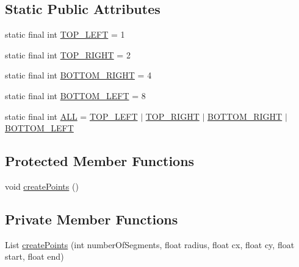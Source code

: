 \subsection*{Static Public Attributes}
\begin{DoxyCompactItemize}
\item 
static final int \mbox{\hyperlink{classorg_1_1newdawn_1_1slick_1_1geom_1_1_rounded_rectangle_aaaa1eab1fd4a8d956245dd981ce1dfab}{T\+O\+P\+\_\+\+L\+E\+FT}} = 1
\item 
static final int \mbox{\hyperlink{classorg_1_1newdawn_1_1slick_1_1geom_1_1_rounded_rectangle_a03e561bba16398be265f6949561f05bd}{T\+O\+P\+\_\+\+R\+I\+G\+HT}} = 2
\item 
static final int \mbox{\hyperlink{classorg_1_1newdawn_1_1slick_1_1geom_1_1_rounded_rectangle_a747856ebcd2fa8d0b68c3506a666da20}{B\+O\+T\+T\+O\+M\+\_\+\+R\+I\+G\+HT}} = 4
\item 
static final int \mbox{\hyperlink{classorg_1_1newdawn_1_1slick_1_1geom_1_1_rounded_rectangle_af5715c13c3b07283282396746796ec1c}{B\+O\+T\+T\+O\+M\+\_\+\+L\+E\+FT}} = 8
\item 
static final int \mbox{\hyperlink{classorg_1_1newdawn_1_1slick_1_1geom_1_1_rounded_rectangle_a5f7a27b3a8d4b4b9c2ea8776674a0fd8}{A\+LL}} = \mbox{\hyperlink{classorg_1_1newdawn_1_1slick_1_1geom_1_1_rounded_rectangle_aaaa1eab1fd4a8d956245dd981ce1dfab}{T\+O\+P\+\_\+\+L\+E\+FT}} $\vert$ \mbox{\hyperlink{classorg_1_1newdawn_1_1slick_1_1geom_1_1_rounded_rectangle_a03e561bba16398be265f6949561f05bd}{T\+O\+P\+\_\+\+R\+I\+G\+HT}} $\vert$ \mbox{\hyperlink{classorg_1_1newdawn_1_1slick_1_1geom_1_1_rounded_rectangle_a747856ebcd2fa8d0b68c3506a666da20}{B\+O\+T\+T\+O\+M\+\_\+\+R\+I\+G\+HT}} $\vert$ \mbox{\hyperlink{classorg_1_1newdawn_1_1slick_1_1geom_1_1_rounded_rectangle_af5715c13c3b07283282396746796ec1c}{B\+O\+T\+T\+O\+M\+\_\+\+L\+E\+FT}}
\end{DoxyCompactItemize}
\subsection*{Protected Member Functions}
\begin{DoxyCompactItemize}
\item 
void \mbox{\hyperlink{classorg_1_1newdawn_1_1slick_1_1geom_1_1_rounded_rectangle_a0470edfde1853ac2e0631b028615a70a}{create\+Points}} ()
\end{DoxyCompactItemize}
\subsection*{Private Member Functions}
\begin{DoxyCompactItemize}
\item 
List \mbox{\hyperlink{classorg_1_1newdawn_1_1slick_1_1geom_1_1_rounded_rectangle_a79907258114cdbe1ab7e2213b25a0187}{create\+Points}} (int number\+Of\+Segments, float radius, float cx, float cy, float start, float end)
\end{DoxyCompactItemize}
